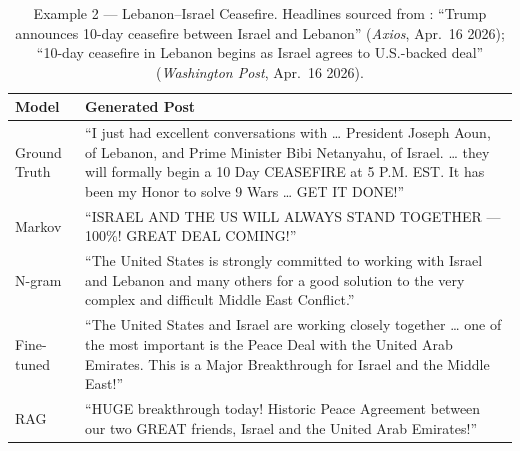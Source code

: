 \documentclass[11pt,a4paper]{article}
\begin{document}
\begin{table}[H]
\centering
\caption{Example 2 --- Lebanon--Israel Ceasefire. Headlines sourced from \citet{axios2026ceasefire,wapo2026ceasefire}: ``Trump announces 10-day ceasefire between Israel and Lebanon'' (\textit{Axios}, Apr.\ 16 2026); ``10-day ceasefire in Lebanon begins as Israel agrees to U.S.-backed deal'' (\textit{Washington Post}, Apr.\ 16 2026).}
\label{tab:qual2}
\begin{tabular}{lp{9.5cm}}
\toprule
\textbf{Model} & \textbf{Generated Post} \\
\midrule
Ground Truth  & ``I just had excellent conversations with \ldots{} President Joseph Aoun, of Lebanon, and Prime Minister Bibi Netanyahu, of Israel. \ldots{} they will formally begin a 10 Day CEASEFIRE at 5 P.M. EST. It has been my Honor to solve 9 Wars \ldots{} GET IT DONE!'' \\
\midrule
Markov        & ``ISRAEL AND THE US WILL ALWAYS STAND TOGETHER — 100\%! GREAT DEAL COMING!'' \\
N-gram        & ``The United States is strongly committed to working with Israel and Lebanon and many others for a good solution to the very complex and difficult Middle East Conflict.'' \\
Fine-tuned    & ``The United States and Israel are working closely together \ldots{} one of the most important is the Peace Deal with the United Arab Emirates. This is a Major Breakthrough for Israel and the Middle East!'' \\
RAG           & ``HUGE breakthrough today! Historic Peace Agreement between our two GREAT friends, Israel and the United Arab Emirates!'' \\
\bottomrule
\end{tabular}
\end{table}
\end{document}
